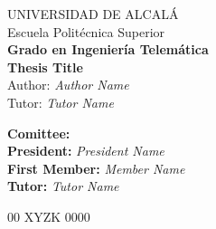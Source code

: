 \begin{center}
    {\Huge UNIVERSIDAD DE ALCALÁ}\\
    \vspace{0.5cm}
    {\huge Escuela Politécnica Superior}\\
    \vspace{1.5cm}
    {\Large \textbf{Grado en Ingeniería Telemática}}\\
    \vspace{3cm}
    {\Large \textbf{Thesis Title}}\\
    \vspace{1.5cm}
    {\large Author: \textit{Author Name}}\\
    \vspace{2.5mm}
    {\large Tutor: \textit{Tutor Name}}\\
    \vspace{2cm}
\end{center}

\begin{flushleft}
    {\large \textbf{Comittee:}}\\
    \vspace{1cm}
    {\large \hspace{2cm} \textbf{President:} \hspace{9mm} \textit{President Name}}\\
    \vspace{0.5cm}
    {\large \hspace{2cm} \textbf{First Member:} \textit{Member Name}}\\
    \vspace{0.5cm}
    {\large \hspace{2cm} \textbf{Tutor:} \hspace{18mm} \textit{Tutor Name}}\\
    \vspace{6cm}
\end{flushleft}

\begin{center}
    $00$ XYZK $0000$
\end{center}

\clearpage
